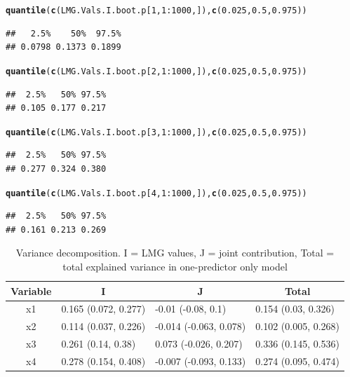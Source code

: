 \documentclass[11pt,a4paper,twoside]{book}\usepackage[]{graphicx}\usepackage[]{color}
\makeatletter
\newcommand{\hlnum}[1]{\textcolor[rgb]{0.686,0.059,0.569}{#1}}%
\newcommand{\hlopt}[1]{\textcolor[rgb]{0,0,0}{#1}}%
\newcommand{\hlstd}[1]{\textcolor[rgb]{0.345,0.345,0.345}{#1}}%
\newcommand{\hlkwd}[1]{\textcolor[rgb]{0.737,0.353,0.396}{\textbf{#1}}}%
\newenvironment{kframe}{%
 \def\at@end@of@kframe{}%
 \ifinner\ifhmode%
  \def\at@end@of@kframe{\end{minipage}}%
  \begin{minipage}{\columnwidth}%
 \fi\fi%
 \def\FrameCommand##1{\hskip\@totalleftmargin \hskip-\fboxsep
 \colorbox{shadecolor}{##1}\hskip-\fboxsep
     \hskip-\linewidth \hskip-\@totalleftmargin \hskip\columnwidth}%
 \MakeFramed {\advance\hsize-\width
   \@totalleftmargin\z@ \linewidth\hsize
   \@setminipage}}%
 {\par\unskip\endMakeFramed%
 \at@end@of@kframe}
\newenvironment{knitrout}{}{} %
\makeatother
\begin{document}
\begin{knitrout}
\begin{kframe}
\begin{alltt}
\hlkwd{quantile}\hlstd{(}\hlkwd{c}\hlstd{(LMG.Vals.I.boot.p[}\hlnum{1}\hlstd{,}\hlnum{1}\hlopt{:}\hlnum{1000}\hlstd{,]),} \hlkwd{c}\hlstd{(}\hlnum{0.025}\hlstd{,} \hlnum{0.5}\hlstd{,} \hlnum{0.975}\hlstd{))}
\end{alltt}
\begin{verbatim}
##   2.5%    50%  97.5% 
## 0.0798 0.1373 0.1899
\end{verbatim}
\begin{alltt}
\hlkwd{quantile}\hlstd{(}\hlkwd{c}\hlstd{(LMG.Vals.I.boot.p[}\hlnum{2}\hlstd{,}\hlnum{1}\hlopt{:}\hlnum{1000}\hlstd{,]),} \hlkwd{c}\hlstd{(}\hlnum{0.025}\hlstd{,} \hlnum{0.5}\hlstd{,} \hlnum{0.975}\hlstd{))}
\end{alltt}
\begin{verbatim}
##  2.5%   50% 97.5% 
## 0.105 0.177 0.217
\end{verbatim}
\begin{alltt}
\hlkwd{quantile}\hlstd{(}\hlkwd{c}\hlstd{(LMG.Vals.I.boot.p[}\hlnum{3}\hlstd{,}\hlnum{1}\hlopt{:}\hlnum{1000}\hlstd{,]),} \hlkwd{c}\hlstd{(}\hlnum{0.025}\hlstd{,} \hlnum{0.5}\hlstd{,} \hlnum{0.975}\hlstd{))}
\end{alltt}
\begin{verbatim}
##  2.5%   50% 97.5% 
## 0.277 0.324 0.380
\end{verbatim}
\begin{alltt}
\hlkwd{quantile}\hlstd{(}\hlkwd{c}\hlstd{(LMG.Vals.I.boot.p[}\hlnum{4}\hlstd{,}\hlnum{1}\hlopt{:}\hlnum{1000}\hlstd{,]),} \hlkwd{c}\hlstd{(}\hlnum{0.025}\hlstd{,} \hlnum{0.5}\hlstd{,} \hlnum{0.975}\hlstd{))}
\end{alltt}
\begin{verbatim}
##  2.5%   50% 97.5% 
## 0.161 0.213 0.269
\end{verbatim}
\end{kframe}
\end{knitrout}



\begin{table}[h]
\centering
\begin{tabular}{clll}
  \hline
  \multicolumn{1}{c}{\textbf{Variable}} & \multicolumn{1}{c}{\textbf{I}} &\multicolumn{1}{c}{\textbf{J}} & \multicolumn{1}{c}{\textbf{Total}} \\
  \hline
x1 & 0.165 (0.072, 0.277)  & -0.01 (-0.08, 0.1)   & 0.154 (0.03, 0.326)  \\ 
x2 & 0.114 (0.037, 0.226)  & -0.014 (-0.063, 0.078)   & 0.102 (0.005, 0.268)  \\ 
x3 & 0.261 (0.14, 0.38)  & 0.073 (-0.026, 0.207)   & 0.336 (0.145, 0.536)  \\ 
x4 & 0.278 (0.154, 0.408)  & -0.007 (-0.093, 0.133)   & 0.274 (0.095, 0.474)  \\ 

   \hline
\end{tabular}
\caption{Variance decomposition. I = LMG values, J = joint contribution, Total = total explained variance in one-predictor only model}
\label{tbl:fundus.to.SLO2}
\end{table}
\end{document}
